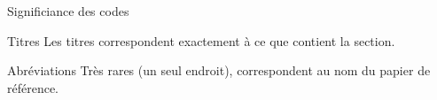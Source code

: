 \begin{frame}{Significiance des codes}
  \begin{block}{Titres}
    Les titres correspondent exactement à ce que contient la section.
  \end{block}

  \begin{block}{Abréviations}
    Très rares (un seul endroit), correspondent au nom du papier de référence.
  \end{block}
\end{frame}
